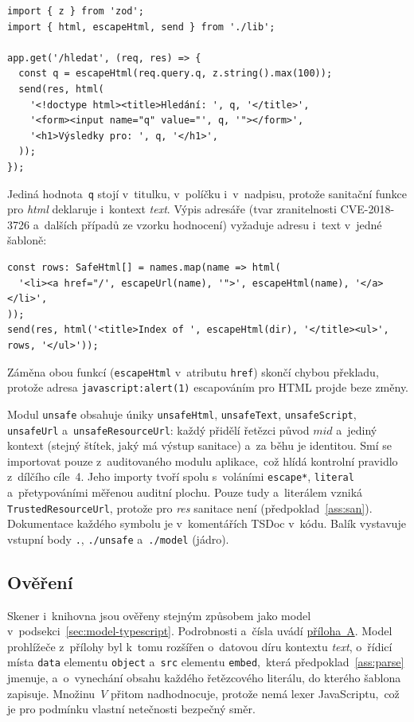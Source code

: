\begin{verbatim}
import { z } from 'zod';
import { html, escapeHtml, send } from './lib';

app.get('/hledat', (req, res) => {
  const q = escapeHtml(req.query.q, z.string().max(100));
  send(res, html(
    '<!doctype html><title>Hledání: ', q, '</title>',
    '<form><input name="q" value="', q, '"></form>',
    '<h1>Výsledky pro: ', q, '</h1>',
  ));
});
\end{verbatim}

\noindent
Jediná hodnota~\texttt{q} stojí v~titulku, v~políčku i~v~nadpisu, protože sanitační funkce pro \emph{html} deklaruje i~kontext \emph{text}. Výpis adresáře (tvar zranitelnosti CVE-2018-3726 a~dalších případů ze vzorku hodnocení) vyžaduje adresu i~text v~jedné šabloně:

\begin{verbatim}
const rows: SafeHtml[] = names.map(name => html(
  '<li><a href="/', escapeUrl(name), '">', escapeHtml(name), '</a></li>',
));
send(res, html('<title>Index of ', escapeHtml(dir), '</title><ul>', rows, '</ul>'));
\end{verbatim}

\noindent
Záměna obou funkcí (\texttt{escapeHtml} v~atributu \texttt{href}) skončí chybou překladu, protože adresa \texttt{javascript:alert(1)} escapováním pro HTML projde beze změny.

Modul \texttt{unsafe} obsahuje úniky \texttt{unsafeHtml}, \texttt{unsafeText}, \texttt{unsafeScript}, \texttt{unsafeUrl} a~\texttt{unsafeResourceUrl}: každý přidělí řetězci původ $\mathit{mid}$ a~jediný kontext (stejný štítek, jaký má výstup sanitace) a~za běhu je identitou. Smí se importovat pouze z~auditovaného modulu aplikace,~což hlídá kontrolní pravidlo z~dílčího cíle~4. Jeho importy tvoří spolu s~voláními \texttt{escape*}, \texttt{literal} a~přetypováními měřenou auditní plochu. Pouze tudy a~literálem vzniká \texttt{TrustedResourceUrl}, protože pro \emph{res} sanitace není (předpoklad~\ref{ass:san}). Dokumentace každého symbolu je v~komentářích TSDoc v~kódu. Balík vystavuje vstupní body \texttt{.}, \texttt{./unsafe} a~\texttt{./model} (jádro).

\subsection{Ověření}
\label{sec:lib-overeni}

Skener i~knihovna jsou ověřeny stejným způsobem jako model v~podsekci~\ref{sec:model-typescript}. Podrobnosti a~čísla uvádí \hyperref[app:own-work]{příloha~A}. Model prohlížeče z~přílohy byl k~tomu rozšířen o~datovou díru kontextu \emph{text}, o~řídicí místa \texttt{data} elementu \texttt{object} a~\texttt{src} elementu \texttt{embed},~která předpoklad~\ref{ass:parse} jmenuje, a~o~vynechání obsahu každého řetězcového literálu, do kterého šablona zapisuje. Množinu~$V$ přitom nadhodnocuje, protože nemá lexer JavaScriptu,~což je pro podmínku vlastní netečnosti bezpečný směr.

